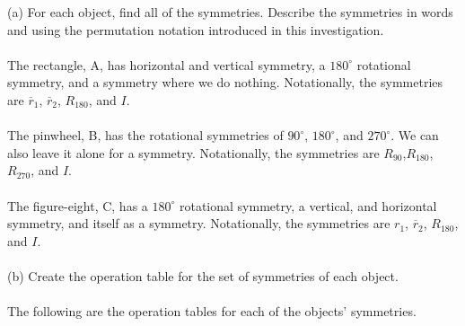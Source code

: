 \documentclass[11pt,a4paper]{article}
\begin{document}
(a) For each object, find all of the symmetries. Describe the symmetries in words and using the permutation notation introduced in this investigation.\\
~\\
The rectangle, A, has horizontal and vertical symmetry, a $180^\circ$ rotational symmetry, and a symmetry where we do nothing. Notationally, the symmetries are $\overline{r}_1$, $\overline{r}_2$, $R_{180}$, and $I$.\\
~\\
The pinwheel, B, has the rotational symmetries of $90^\circ$, $180^\circ$, and $270^\circ$. We can also leave it alone for a symmetry. Notationally, the symmetries are $R_{90}$,$R_{180}$, $R_{270}$, and $I$.\\
~\\
The figure-eight, C, has a $180^\circ$ rotational symmetry, a vertical, and horizontal symmetry, and itself as a symmetry. Notationally, the symmetries are $r_1$, $\overline{r}_2$, $R_{180}$, and $I$.\\
~\\
(b) Create the operation table for the set of symmetries of each object.\\
~\\
The following are the operation tables for each of the objects' symmetries.\\
~\\
\end{document}
